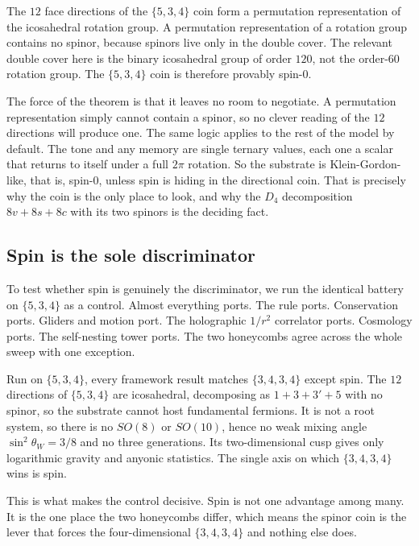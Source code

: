 \begin{theorem}
The $12$ face directions of the $\{5,3,4\}$ coin form a permutation representation of the icosahedral rotation
group. A permutation representation of a rotation group contains no spinor, because spinors live only in the
double cover. The relevant double cover here is the binary icosahedral group of order $120$, not the order-$60$
rotation group. The $\{5,3,4\}$ coin is therefore provably spin-$0$.
\end{theorem}

The force of the theorem is that it leaves no room to negotiate. A permutation representation simply cannot
contain a spinor, so no clever reading of the $12$ directions will produce one. The same logic applies to the
rest of the model by default. The tone and any memory are single ternary values, each one a scalar that returns
to itself under a full $2\pi$ rotation. So the substrate is Klein-Gordon-like, that is, spin-$0$, unless spin is
hiding in the directional coin. That is precisely why the coin is the only place to look, and why the $D_4$
decomposition $8v + 8s + 8c$ with its two spinors is the deciding fact.

\subsection{Spin is the sole discriminator}

To test whether spin is genuinely the discriminator, we run the identical battery on $\{5,3,4\}$ as a control.
Almost everything ports. The rule ports. Conservation ports. Gliders and motion port. The holographic $1/r^2$
correlator ports. Cosmology ports. The self-nesting tower ports. The two honeycombs agree across the whole sweep
with one exception.

\begin{result}
Run on $\{5,3,4\}$, every framework result matches $\{3,4,3,4\}$ except spin. The $12$ directions of $\{5,3,4\}$
are icosahedral, decomposing as $1 + 3 + 3' + 5$ with no spinor, so the substrate cannot host fundamental
fermions. It is not a root system, so there is no $SO(8)$ or $SO(10)$, hence no weak mixing angle
$\sin^2\theta_W = 3/8$ and no three generations. Its two-dimensional cusp gives only logarithmic gravity and
anyonic statistics. The single axis on which $\{3,4,3,4\}$ wins is spin. \cite{pollard2026vibetest}
\end{result}

This is what makes the control decisive. Spin is not one advantage among many. It is the one place the two
honeycombs differ, which means the spinor coin is the lever that forces the four-dimensional $\{3,4,3,4\}$ and
nothing else does.

